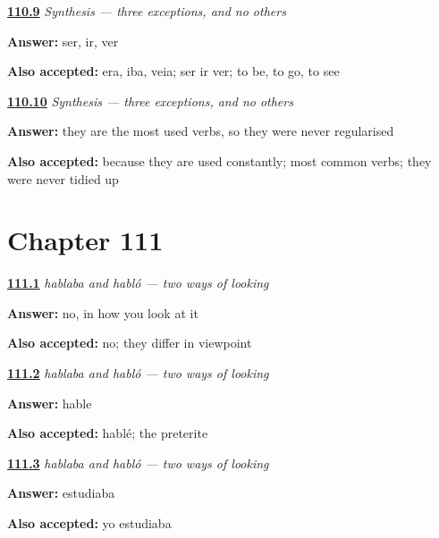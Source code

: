 \noindent\begin{minipage}[t]{\linewidth}
\raggedright
\hyperlink{review-ES-C16-sintesis-imperfecto-which}{\textbf{110.9}} \emph{Synthesis — three exceptions, and no others}\par
\small \textbf{Answer:} ser, ir, ver\par
\footnotesize \textbf{Also accepted:} era, iba, veia; ser ir ver; to be, to go, to see
\end{minipage}\par\medskip

\noindent\begin{minipage}[t]{\linewidth}
\raggedright
\hyperlink{review-ES-C16-sintesis-imperfecto-why}{\textbf{110.10}} \emph{Synthesis — three exceptions, and no others}\par
\small \textbf{Answer:} they are the most used verbs, so they were never regularised\par
\footnotesize \textbf{Also accepted:} because they are used constantly; most common verbs; they were never tidied up
\end{minipage}\par\medskip

\section*{Chapter 111}

\noindent\begin{minipage}[t]{\linewidth}
\raggedright
\hyperlink{review-ES-C48-dos-miradas-which}{\textbf{111.1}} \emph{hablaba and habló — two ways of looking}\par
\small \textbf{Answer:} no, in how you look at it\par
\footnotesize \textbf{Also accepted:} no; they differ in viewpoint
\end{minipage}\par\medskip

\noindent\begin{minipage}[t]{\linewidth}
\raggedright
\hyperlink{review-ES-C48-dos-miradas-outside}{\textbf{111.2}} \emph{hablaba and habló — two ways of looking}\par
\small \textbf{Answer:} hable\par
\footnotesize \textbf{Also accepted:} hablé; the preterite
\end{minipage}\par\medskip

\noindent\begin{minipage}[t]{\linewidth}
\raggedright
\hyperlink{review-ES-C48-dos-miradas-inside}{\textbf{111.3}} \emph{hablaba and habló — two ways of looking}\par
\small \textbf{Answer:} estudiaba\par
\footnotesize \textbf{Also accepted:} yo estudiaba
\end{minipage}\par\medskip


